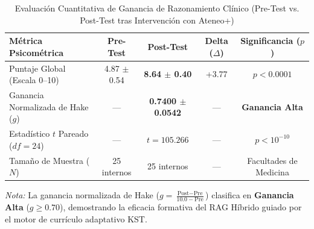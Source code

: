 \begin{table}[htbp]
\centering
\caption{Evaluación Cuantitativa de Ganancia de Razonamiento Clínico (Pre-Test vs. Post-Test tras Intervención con Ateneo+)}
\label{tab:learning_gain_pilot}
\begin{tabular}{lcccc}
\hline
\textbf{Métrica Psicométrica} & \textbf{Pre-Test} & \textbf{Post-Test} & \textbf{Delta ($\Delta$)} & \textbf{Significancia ($p$)} \\
\hline
Puntaje Global (Escala 0--10) & 4.87 $\pm$ 0.54 & \textbf{8.64 $\pm$ 0.40} & +3.77 & $p < 0.0001$ \\
Ganancia Normalizada de Hake ($g$) & --- & \textbf{0.7400 $\pm$ 0.0542} & --- & \textbf{Ganancia Alta} \\
Estadístico $t$ Pareado ($df=24$) & --- & $t = 105.266$ & --- & $p < 10^{-10}$ \\
Tamaño de Muestra ($N$) & 25 internos & 25 internos & --- & Facultades de Medicina \\
\hline
\end{tabular}
\vspace{1mm}
\begin{minipage}{\linewidth}
\footnotesize
\textit{Nota:} La ganancia normalizada de Hake ($g = \frac{\text{Post} - \text{Pre}}{10.0 - \text{Pre}}$) clasifica en \textbf{Ganancia Alta} ($g \ge 0.70$), demostrando la eficacia formativa del RAG Híbrido guiado por el motor de currículo adaptativo KST.
\end{minipage}
\end{table}
